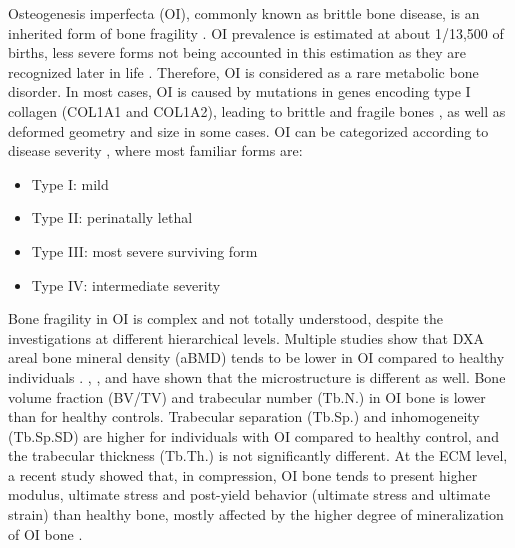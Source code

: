 \documentclass[a4paper,fleqn]{DC_ArtStyle}
\begin{document}
Osteogenesis imperfecta (OI), commonly known as brittle bone disease, is an inherited form of bone fragility \cite{Tournis2018}. OI prevalence is estimated at about  1/13,500 of births, less severe forms not being accounted in this estimation as they are recognized later in life \cite{Lindahl2015}. Therefore, OI is considered as a rare metabolic bone disorder. In most cases, OI is caused by mutations in genes encoding type I collagen (COL1A1 and COL1A2), leading to brittle and fragile bones \cite{LIM2017}, as well as deformed geometry and size in some cases. OI can be categorized according to disease severity \cite{Mortier2019}, where most familiar forms are:
\begin{itemize}
	\item Type I: mild
	\item Type II: perinatally lethal
	\item Type III: most severe surviving form
	\item Type IV: intermediate severity
\end{itemize}

Bone fragility in OI is complex and not totally understood, despite the investigations at different hierarchical levels. Multiple studies show that DXA areal bone mineral density (aBMD) tends to be lower in OI compared to healthy individuals \cite{Folkestad2012,Lindahl2015,Scheres2018}.  \citeauthor{Folkestad2012}\cite{Folkestad2012}, \citeauthor{Kocijan2015}\cite{Kocijan2015}, and \citeauthor{Rolvien2018}\cite{Rolvien2018} have shown that the microstructure is different as well. Bone volume fraction (BV/TV) and trabecular number (Tb.N.) in OI bone is lower than for healthy controls. Trabecular separation (Tb.Sp.) and inhomogeneity (Tb.Sp.SD) are higher for individuals with OI compared to healthy control, and the trabecular thickness (Tb.Th.) is not significantly different. At the ECM level, a recent study showed that, in compression, OI bone tends to present higher modulus, ultimate stress and post-yield behavior (ultimate stress and ultimate strain) than healthy bone, mostly affected by the higher degree of mineralization of OI bone \cite{Indermaur2021}.\\
\end{document}
